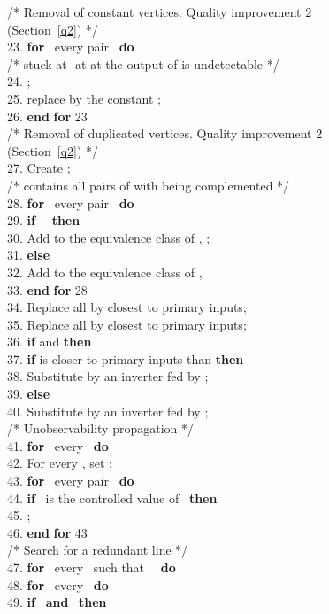 \documentclass[conference]{IEEEtran} \usepackage{times}
\newcommand{\AND}{\textbf{and} }
\newcommand{\ELSE}{\textbf{else} }
\newcommand{\END}{\textbf{end} }
\newcommand{\DO}{\textbf{do} }
\newcommand{\FOR}{\textbf{for} }
\newcommand{\IF}{\textbf{if} }
\newcommand{\THEN}{\textbf{then} }
\begin{document}
\begin{figure}[t!]
\begin{center}
{\begin{tabbing}
/* Removal of constant vertices. Quality improvement 2 (Section~\ref{q2}) */ \\
23. \> \> \FOR \ every pair  \ \DO \\
\> \> \> /* stuck-at- at at the output of   is undetectable */ \\
24. \> \> \> ; \\
25. \> \> \> replace  by the constant ; \\
26. \> \> \END \FOR 23 \\ 

/* Removal of duplicated vertices. Quality improvement 2 (Section~\ref{q2}) */ \\
27. \> \> Create ; \\ 
\> \> /*  contains all pairs of  with  being complemented */ \\
28. \> \> \FOR \ every pair  \ \DO \\
29. \> \> \> \IF \  \ \THEN \\
30. \> \> \> \> Add  to the equivalence class of , ; \\
31. \> \> \> \ELSE \\
32. \> \> \> \> Add  to the equivalence class of ,  \\
33. \> \> \END \FOR 28 \\ 
34. \> \> Replace all  by  closest to primary inputs; \\
35. \> \> Replace all  by  
closest to primary inputs; \\

36. \> \> \IF  and  \THEN \\
37. \> \> \> \IF  is closer to primary inputs than  \THEN \\
38. \> \> \> \> Substitute  by an inverter fed by ; \\
39. \> \> \> \ELSE \\
40. \> \> \> \> Substitute  by an inverter fed by ; \\

/* Unobservability propagation */ \\
41. \> \> \FOR \ every  \ \DO \\ 
42. \> \> For every  , set ; \\
43. \> \> \> \FOR \ every pair  \ \DO \\
44. \> \> \> \> \IF \  is the controlled value of  \ \THEN \\
45. \> \> \> \> \> ; \\
46. \> \> \> \END \FOR 43 \\

/* Search for a redundant line */ \\
47. \> \> \> \FOR \ every  \ such that \  \ \DO \\
48.  \> \> \> \> \FOR \ every  \ \DO \\
49. \> \> \> \> \> \IF \  \AND  \ \THEN \\


\end{tabbing}}
\end{center}
\end{figure}
\end{document}
